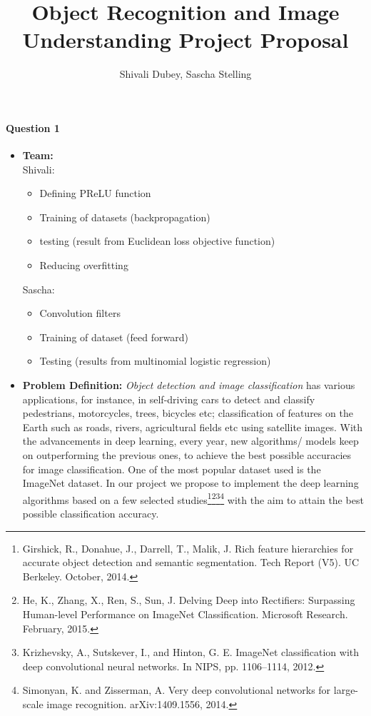 \documentclass[8pt,a4]{article}
\author{Shivali Dubey, Sascha Stelling}
\title{Object Recognition and Image Understanding Project Proposal}
\begin{document}
\maketitle

\paragraph{Question 1}
\begin{itemize}
	\item \textbf{Team:} \\Shivali:
	\begin{itemize}
		\item Defining PReLU function
		\item Training of datasets (backpropagation)
		\item testing (result from Euclidean loss objective function)
		\item Reducing overfitting
	\end{itemize}
	Sascha:
	\begin{itemize}
		\item Convolution filters
		\item Training of dataset (feed forward)
		\item Testing (results from multinomial logistic regression)
	\end{itemize}
	\item \textbf{Problem Definition:} \textit{Object detection and image classification} has various applications, for instance, in self-driving cars to detect and classify pedestrians, motorcycles, trees, bicycles etc; classification of features on the Earth such as roads, rivers, agricultural fields etc using satellite images. With the advancements in deep learning, every year, new algorithms/ models keep on outperforming the previous ones, to achieve the best possible accuracies for image classification. One of the most popular dataset used is the ImageNet dataset. In our project we propose to implement the deep learning algorithms based on a few selected studies\footnote{\label{note1}Girshick, R., Donahue, J., Darrell, T., Malik, J. Rich feature hierarchies for accurate object detection and semantic segmentation. Tech Report (V5). UC Berkeley. October, 2014.}\footnote{\label{note2}He, K., Zhang, X., Ren, S., Sun, J. Delving Deep into Rectifiers: Surpassing Human-level Performance on ImageNet Classification. Microsoft Research. February, 2015.}\footnote{\label{note3}Krizhevsky, A., Sutskever, I., and Hinton, G. E. ImageNet classification with deep convolutional neural networks. In NIPS, pp. 1106–1114, 2012.
	}\footnote{\label{note5}Simonyan, K. and Zisserman, A. Very deep convolutional networks for large-scale image recognition. arXiv:1409.1556, 2014.
} with the aim to attain the best possible classification accuracy.
	

\end{itemize}
\end{document}
